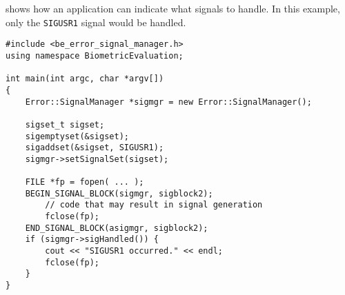  shows how an application can indicate what
signals to handle. In this example, only the {\tt SIGUSR1} signal would
be handled.

\lstset{language=c++}
\begin{lstlisting}[caption={Specifying Signals to the SignalManger}, label=signalmanageruse2]
#include <be_error_signal_manager.h>
using namespace BiometricEvaluation;

int main(int argc, char *argv[])
{
    Error::SignalManager *sigmgr = new Error::SignalManager();

    sigset_t sigset;
    sigemptyset(&sigset);
    sigaddset(&sigset, SIGUSR1);
    sigmgr->setSignalSet(sigset);

    FILE *fp = fopen( ... );
    BEGIN_SIGNAL_BLOCK(sigmgr, sigblock2);
        // code that may result in signal generation
        fclose(fp);
    END_SIGNAL_BLOCK(asigmgr, sigblock2);
    if (sigmgr->sigHandled()) {
        cout << "SIGUSR1 occurred." << endl;
        fclose(fp);
    }
}
\end{lstlisting}
